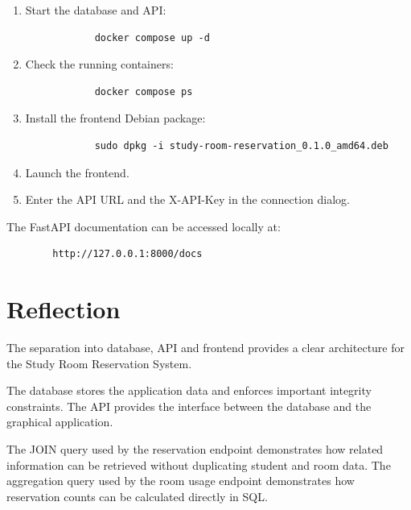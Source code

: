 \documentclass[10pt,a4paper]{article}
\begin{document}
	\begin{enumerate}[leftmargin=7mm,itemsep=3pt]
		
		\item
		Start the database and API:
		
		\begin{lstlisting}
			docker compose up -d
		\end{lstlisting}
		
		\item
		Check the running containers:
		
		\begin{lstlisting}
			docker compose ps
		\end{lstlisting}
		
		\item
		Install the frontend Debian package:
		
		\begin{lstlisting}
			sudo dpkg -i study-room-reservation_0.1.0_amd64.deb
		\end{lstlisting}
		
		\item
		Launch the frontend.
		
		\item
		Enter the API URL and the X-API-Key in the connection dialog.
		
	\end{enumerate}
	
	The FastAPI documentation can be accessed locally at:
	
	\begin{lstlisting}
		http://127.0.0.1:8000/docs
	\end{lstlisting}
	
	
	
	\section{Reflection}
	
	The separation into database, API and frontend provides a clear
	architecture for the Study Room Reservation System.
	
	The database stores the application data and enforces important
	integrity constraints. The API provides the interface between the
	database and the graphical application.
	
	The JOIN query used by the reservation endpoint demonstrates how
	related information can be retrieved without duplicating student and
	room data. The aggregation query used by the room usage endpoint
	demonstrates how reservation counts can be calculated directly in
	SQL.
	
\end{document}

